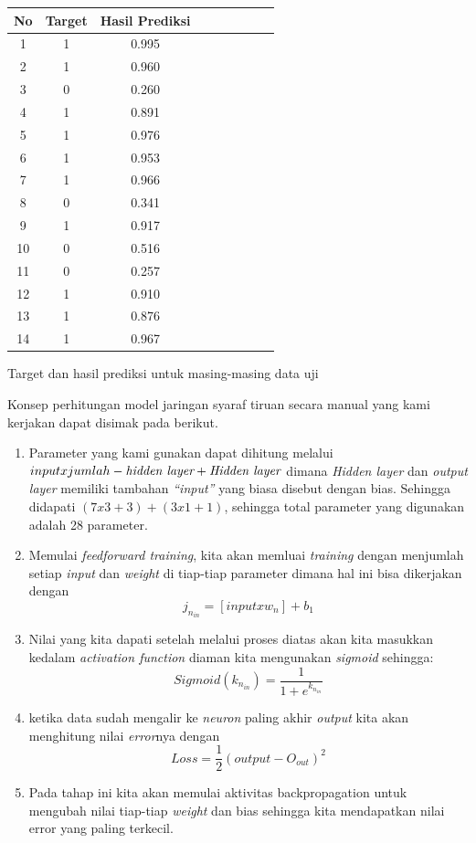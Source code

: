 \begin{center}
	\begin{tabular}{|c|c|c|c|c|c|c|c|c|}
		\hline
		No & Target & Hasil Prediksi  \\
		\hline
		\hline
		1 & 1 & 0.995  \\
		\hline
		2 & 1 & 0.960 \\
		\hline
		3 & 0 & 0.260 \\
		\hline
		4 & 1 & 0.891 \\
		\hline
		5 & 1 & 0.976 \\
		\hline
		6 & 1 & 0.953 \\
		\hline
		7 & 1 & 0.966 \\
		\hline
		8 & 0 & 0.341 \\
		\hline
		9 & 1 & 0.917 \\
		\hline
		10 & 0 & 0.516 \\
		\hline
		11 & 0 & 0.257 \\
		\hline
		12 & 1 & 0.910 \\
		\hline
		13 & 1 & 0.876 \\
		\hline
		14 & 1 & 0.967 \\
		\hline
	\end{tabular}
	\par
	\bigskip
	Target dan hasil prediksi untuk masing-masing data uji
\end{center}

\par 
Konsep perhitungan model jaringan syaraf tiruan secara manual yang kami kerjakan dapat disimak pada berikut.
 \begin{enumerate}
 	\item Parameter yang kami gunakan dapat dihitung melalui $ input x jumlah-  \emph{hidden layer} + \emph{Hidden layer} $ dimana \emph{ Hidden layer} dan \emph{output layer} memiliki tambahan \emph{“input”} yang biasa disebut dengan bias. Sehingga didapati $ (7 x 3 + 3) + (3 x 1 + 1) $, sehingga total parameter yang digunakan adalah 28 parameter.
 	
 	\item Memulai  \emph{feedforward training}, kita akan memluai \emph{training} dengan menjumlah setiap \emph{input} dan \emph{weight} di tiap-tiap parameter dimana hal ini bisa dikerjakan dengan $$ j_{n_{in}} = [input x w_{n}] + b_{1} $$
 	
 	\item Nilai yang kita dapati setelah melalui proses diatas akan kita masukkan kedalam \emph{activation function} diaman kita mengunakan \emph{sigmoid} sehingga:
 	$$ Sigmoid(k_{n_{in}}) = \frac{1}{1 + e^{k_{n_{in}}}} $$
 	\item ketika data sudah mengalir ke \emph{neuron} paling akhir \emph{output} kita akan menghitung nilai \emph{error}nya dengan $$ Loss = \frac{1}{2}(output-O_{out})^{2} $$
 	
 	\item Pada tahap ini kita akan memulai aktivitas backpropagation untuk mengubah nilai tiap-tiap \emph{weight} dan bias sehingga kita mendapatkan nilai error yang paling terkecil.
 \end{enumerate}

